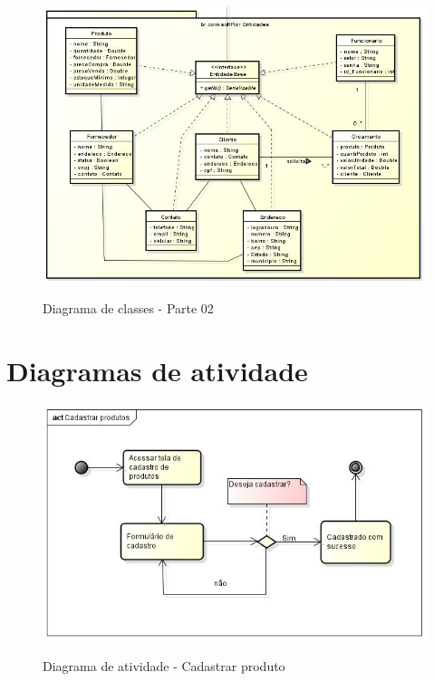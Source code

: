 \begin{anexosenv}
\begin{figure}[H]
\centering
\caption{Diagrama de classes - Parte 02}
\includegraphics[width=16cm]{imagens/diagramas/Classes01}
\label{fig:Diagrama de classes 02}
\end{figure}

	
\chapter{Diagramas de atividade}

\begin{figure}[h]
\centering
\caption{Diagrama de atividade - Cadastrar produto}
\includegraphics[width=12cm]{imagens/diagramas/atCadastrar}
\label{fig:Diagrama de atividade - Cadastrar}
\end{figure}



\end{anexosenv}
